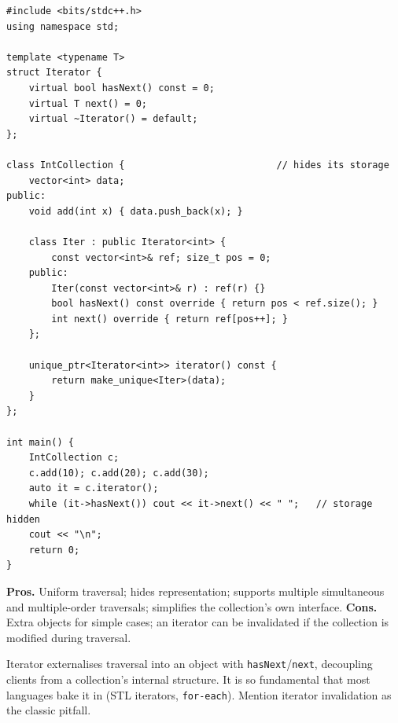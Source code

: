 \begin{lstlisting}
#include <bits/stdc++.h>
using namespace std;

template <typename T>
struct Iterator {
    virtual bool hasNext() const = 0;
    virtual T next() = 0;
    virtual ~Iterator() = default;
};

class IntCollection {                           // hides its storage
    vector<int> data;
public:
    void add(int x) { data.push_back(x); }

    class Iter : public Iterator<int> {
        const vector<int>& ref; size_t pos = 0;
    public:
        Iter(const vector<int>& r) : ref(r) {}
        bool hasNext() const override { return pos < ref.size(); }
        int next() override { return ref[pos++]; }
    };

    unique_ptr<Iterator<int>> iterator() const {
        return make_unique<Iter>(data);
    }
};

int main() {
    IntCollection c;
    c.add(10); c.add(20); c.add(30);
    auto it = c.iterator();
    while (it->hasNext()) cout << it->next() << " ";   // storage hidden
    cout << "\n";
    return 0;
}
\end{lstlisting}

\begin{complexitybox}
\textbf{Pros.} Uniform traversal; hides representation; supports multiple
simultaneous and multiple-order traversals; simplifies the collection's
own interface. \textbf{Cons.} Extra objects for simple cases; an iterator
can be invalidated if the collection is modified during traversal.
\end{complexitybox}

\begin{takeawaybox}
Iterator externalises traversal into an object with
\texttt{hasNext}/\texttt{next}, decoupling clients from a collection's
internal structure. It is so fundamental that most languages bake it in
(STL iterators, \texttt{for-each}). Mention iterator invalidation as the
classic pitfall.
\end{takeawaybox}
